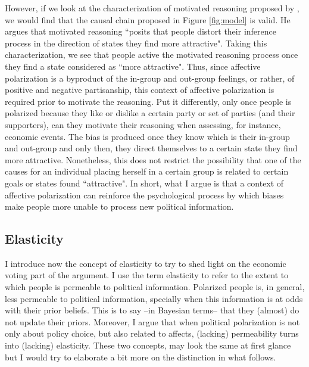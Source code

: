 \documentclass[a4paper, svgnames]{article}
\begin{document}
However, if we look at the characterization of motivated reasoning proposed by \cite{Thaler2021}, we would find that the causal chain proposed in Figure \ref{fig:model} is valid. He argues that motivated reasoning ``posits that people distort their inference process in the direction of states they find more attractive". Taking this characterization, we see that people active the motivated reasoning process once they find a state considered as ``more attractive". Thus, since affective polarization is a byproduct of the in-group and out-group feelings, or rather, of positive and negative partisanship, this context of affective polarization is required prior to motivate the reasoning. Put it differently, only once people is polarized because they like or dislike a certain party or set of parties (and their supporters), can they motivate their reasoning when assessing, for instance, economic events. The bias is produced once they know which is their in-group and out-group and only then, they direct themselves to a certain state they find more attractive. Nonetheless, this does not restrict the possibility that one of the causes for an individual placing herself in a certain group is related to certain goals or states found ``attractive". In short, what I argue is that a context of affective polarization can reinforce the psychological process by which biases make people more unable to process new political information.

\subsection{Elasticity}

I introduce now the concept of elasticity to try to shed light on the economic voting part of the argument. I use the term elasticity to refer to the extent to which people is permeable to political information. Polarized people is, in general, less permeable to political information, specially when this information is at odds with their prior beliefs. This is to say --in Bayesian terms-- that they (almost) do not update their priors. Moreover, I argue that when political polarization is not only about policy choice, but also related to affects, (lacking) permeability turns into (lacking) elasticity. These two concepts, may look the same at first glance but I would try to elaborate a bit more on the distinction in what follows.
\end{document}
